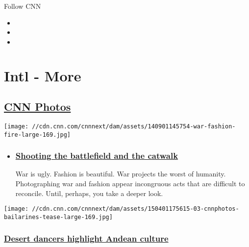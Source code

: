 Follow CNN

\begin{itemize}
\item
\item
\item
\end{itemize}

\hypertarget{intl---more}{%
\section{Intl - More}\label{intl---more}}

\hypertarget{cnn-photos-}{%
\subsection{\texorpdfstring{\href{/specials/photos}{CNN
Photos}~}{CNN Photos~}}\label{cnn-photos-}}

\texttt{[image: //cdn.cnn.com/cnnnext/dam/assets/140901145754-war-fashion-fire-large-169.jpg]}

\begin{itemize}
\item
  \hypertarget{shooting-the-battlefield-and-the-catwalk}{%
  \subsubsection{\texorpdfstring{\href{http://www.cnn.com/interactive/2013/02/world/war-and-fashion/}{Shooting
  the battlefield and the
  catwalk}}{Shooting the battlefield and the catwalk}}\label{shooting-the-battlefield-and-the-catwalk}}

  War is ugly. Fashion is beautiful. War projects the worst of humanity.
  Photographing war and fashion appear incongruous acts that are
  difficult to reconcile. Until, perhaps, you take a deeper look.
\end{itemize}

\href{/2015/04/07/world/cnnphotos-dancers-atacama-desert-chile/index.html}{}

\texttt{[image: //cdn.cnn.com/cnnnext/dam/assets/150401175615-03-cnnphotos-bailarines-tease-large-169.jpg]}

\hypertarget{desert-dancers-highlight-andean-culture}{%
\subsubsection{\texorpdfstring{\href{/2015/04/07/world/cnnphotos-dancers-atacama-desert-chile/index.html}{Desert
dancers highlight Andean
culture}}{Desert dancers highlight Andean culture}}\label{desert-dancers-highlight-andean-culture}}

